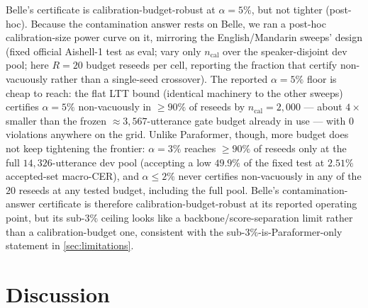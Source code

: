 \documentclass[11pt]{article}
\begin{document}
Belle's certificate is calibration-budget-robust at $\alpha=5\%$, but not tighter
(post-hoc). Because the contamination answer rests on Belle, we ran a post-hoc
calibration-size power curve on it, mirroring the English/Mandarin sweeps' design (fixed
official Aishell-1 test as eval; vary only $n_{\mathrm{cal}}$ over the speaker-disjoint dev
pool; here $R{=}20$ budget reseeds per cell, reporting the fraction that certify
non-vacuously rather than a single-seed crossover). The reported $\alpha{=}5\%$ floor is
cheap to reach: the flat LTT bound (identical machinery to the other sweeps) certifies
$\alpha{=}5\%$ non-vacuously in $\ge90\%$ of reseeds by $n_{\mathrm{cal}}{=}2{,}000$ ---
about $4\times$ smaller than the frozen $\approx3{,}567$-utterance gate budget already in
use --- with $0$ violations anywhere on the grid. Unlike Paraformer, though, more budget
does not keep tightening the frontier: $\alpha{=}3\%$ reaches $\ge90\%$ of reseeds only at
the full $14{,}326$-utterance dev pool (accepting a low $49.9\%$ of the fixed test
at $2.51\%$ accepted-set macro-CER), and $\alpha\le2\%$ never certifies non-vacuously in
any of the $20$ reseeds at any tested budget, including the full pool. Belle's
contamination-answer certificate is therefore calibration-budget-robust at its reported
operating point, but its sub-$3\%$ ceiling looks like a backbone/score-separation limit
rather than a calibration-budget one, consistent with the sub-$3\%$-is-Paraformer-only
statement in \cref{sec:limitations}.

\section{Discussion}\label{sec:discussion}
\end{document}
